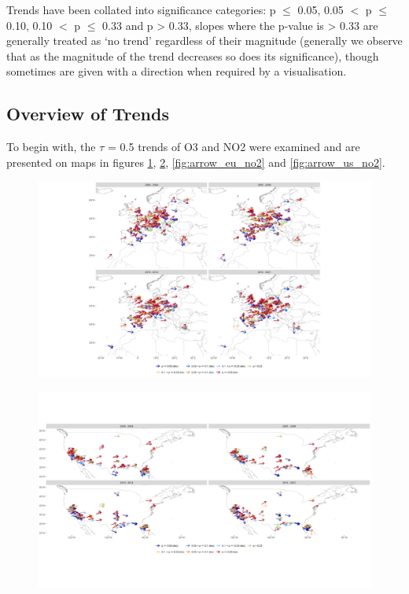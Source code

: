 \documentclass[journal abbreviation, manuscript]{copernicus}
\begin{document}
Trends have been collated into significance categories: p $\le$ 0.05, 0.05 $<$ p $\le$ 0.10, 0.10 $<$ p $\le$ 0.33 and p > 0.33, slopes where the p-value is > 0.33 are generally treated as ‘no trend’ regardless of their magnitude (generally we observe that as the magnitude of the trend decreases so does its significance), though sometimes are given with a direction when required by a visualisation.

\subsection{Overview of Trends} \label{sect:overview_of_trends}
To begin with, the $\tau$ = 0.5 trends of O3 and NO2 were examined and are presented on maps in figures \ref{fig:arrow_eu_o3}, \ref{fig:arrow_us_o3}, \ref{fig:arrow_eu_no2} and \ref{fig:arrow_us_no2}.

\begin{figure}[htbp]
\includegraphics[width=12cm]{plots/arrow_maps/o3/11/EU_map_spc_o3_tau_0.5_seg_11_14.png}
\caption{}
\label{fig:arrow_eu_o3}
\end{figure}

\begin{figure}[htbp]
\includegraphics[width=12cm]{plots/arrow_maps/o3/11/US_map_spc_o3_tau_0.5_seg_11_14.png}
\caption{}
\label{fig:arrow_us_o3}
\end{figure}
\end{document}
